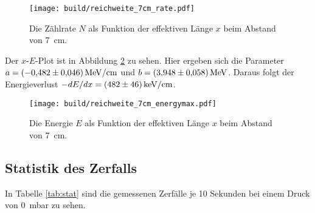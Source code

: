 \begin{figure}[H]
    \centering
    \texttt{[image: build/reichweite\_7cm\_rate.pdf]}
    \caption[]{Die Zählrate $N$ als Funktion der effektiven Länge $x$ beim Abstand von \qty{7}{\cm}.}
    \label{fig:rate_7cm}
\end{figure}

\noindent
Der $x$-$E$-Plot ist in Abbildung \ref{fig:energie_7cm} zu sehen. 
Hier ergeben sich die Parameter $a = \qty{-0.482 +- 0.046}{\mega\electronvolt\per\cm}$ und $b= \qty{3.948 +- 0.058}{\mega\electronvolt}$.
Daraus folgt der Energieverlust $- {dE}/{dx} = \qty{482 +- 46}{\kilo\electronvolt\per\cm}$.


\begin{figure}[H]
    \centering
    \texttt{[image: build/reichweite\_7cm\_energymax.pdf]}
    \caption[]{Die Energie $E$ als Funktion der effektiven Länge $x$ beim Abstand von \qty{7}{\cm}.}
    \label{fig:energie_7cm}
\end{figure}





\subsection[]{Statistik des Zerfalls}
In Tabelle \ref{tab:stat} sind die gemessenen Zerfälle je 10 Sekunden bei einem Druck von \qty{0}{\milli\bar} zu sehen.

